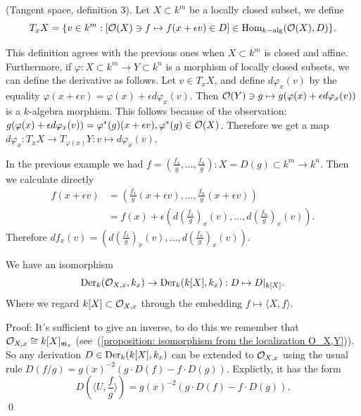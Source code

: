 \begin{dang}
    \begin{definition}
        (Tangent space, definition 3). Let $X\subset k^m$ be a locally closed subset, we define 
        \begin{equation}
            T_xX = \{v\in k^m: [\mathcal{O}(X)\ni f\mapsto f(x+\epsilon v)\in D] \in\text{Hom}_{k-\text{alg}}(\mathcal{O}(X), D) \}.
        \end{equation}
    \end{definition}
\end{dang}
This definition agrees with the previous ones when $X\subset k^m$ is closed and affine. Furthermore, if 
$\varphi: X\subset k^m\to Y\subset k^n$ is a morphism of locally closed subsets, we can define the derivative as follows. 
Let $v\in T_xX$, and define $d\varphi_x(v)$ by the equality $\varphi(x+\epsilon v)=\varphi(x)+\epsilon d\varphi_x(v)$. 
Then $\mathcal{O}(Y)\ni g\mapsto g(\varphi(x)+\epsilon d\varphi_x(v))$ is a $k$-algebra morphism. This follows because of the observation:
$g(\varphi(x)+\epsilon d\varphi_x(v))=\varphi^*(g)(x+\epsilon v), \varphi^*(g)\in\mathcal{O}(X)$. Therefore 
we get a map $d\varphi_x: T_xX\to T_{\varphi(x)}Y: v\mapsto d\varphi_x(v)$.
\begin{example}
In the previous example we had $f = (\tfrac{f_1}{g},\dots,\tfrac{f_n}{g}):X=D(g)\subset k^m \rightarrow k^n$. 
Then we calculate directly 
\begin{equation}
    \begin{split}
        f(x+\epsilon v) &= (\frac{f_1}{g}(x+\epsilon v),\dots, \frac{f_n}{g}(x+\epsilon v))\\
        &=f(x) +\epsilon (d(\frac{f_1}{g})_x(v),\dots, d(\frac{f_n}{g})_x(v)).
    \end{split}
\end{equation}     
Therefore $df_x(v) = (d(\tfrac{f_1}{g})_x(v),\dots, d(\tfrac{f_n}{g})_x(v))$.
\end{example}


\begin{dang}
    \begin{lemma}
        We have an isomorphism 
        \begin{equation}
            \text{Der}_k(\mathcal{O}_{X,x},k_x)\rightarrow \text{Der}_k(k[X],k_x): D\mapsto D|_{k[X]}.
        \end{equation}
        Where we regard $k[X]\subset \mathcal{O}_{X,x}$ through the embedding 
        $f\mapsto \langle X, f\rangle$. 
    \end{lemma}
\end{dang}
Proof: It's sufficient to give an inverse, to do this we remember that 
$\mathcal{O}_{X,x}\cong k[X]_{\mathfrak{m}_x}$ (see~(\ref{proposition: isomorphism from the localization O_X,Y})). 
So any derivation $D\in\text{Der}_k(k[X],k_x)$ can be extended to $\mathcal{O}_{X,x}$ using the 
usual rule $D(f/g)=g(x)^{-2}(g\cdot D(f)-f\cdot D(g))$. Explictly, it has the form 
\begin{equation}
    D(\langle U, \frac{f}{g}\rangle) = g(x)^{-2}(g\cdot D(f)-f\cdot D(g)).
\end{equation}
\qed 

